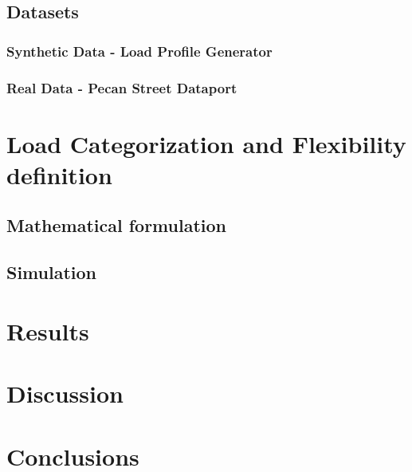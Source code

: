 \subsection{Datasets}
\subsubsection{Synthetic Data - Load Profile Generator}
\subsubsection{Real Data - Pecan Street Dataport}

\section{Load Categorization and Flexibility definition}
\subsection{Mathematical formulation}
\subsection{Simulation}

\section{Results}
\section{Discussion}
\section{Conclusions}